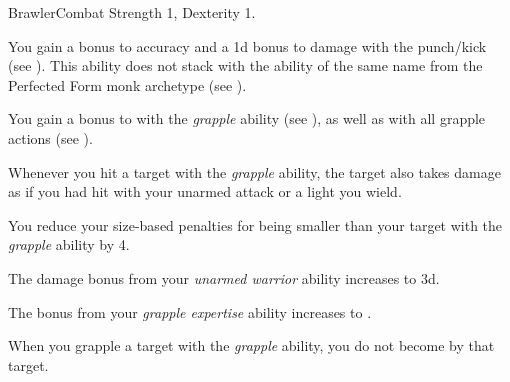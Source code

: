     \begin{feat}{Brawler}{Combat}
        \featpre Strength 1, Dexterity 1.

         You gain a  bonus to accuracy and a \plus1d bonus to damage with the punch/kick  (see ).
        This ability does not stack with the ability of the same name from the Perfected Form monk archetype (see ).

         You gain a  bonus to  with the \textit{grapple} ability (see ), as well as with all grapple actions (see ).

         Whenever you hit a target with the \textit{grapple} ability, the target also takes damage as if you had hit with your unarmed attack or a light  you wield.

         You reduce your size-based penalties for being smaller than your target with the \textit{grapple} ability by 4.

         The damage bonus from your \textit{unarmed warrior} ability increases to \plus3d.

         The bonus from your \textit{grapple expertise} ability increases to .

         When you grapple a target with the \textit{grapple} ability, you do not become \grappled by that target.
    \end{feat}


